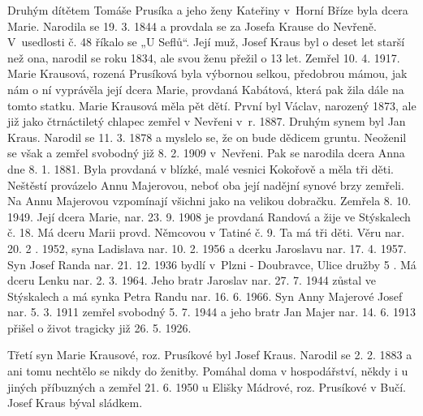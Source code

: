 \documentclass[../dejiny-rodu-prusiku.tex]{subfiles}
\begin{document}

Druhým dítětem Tomáše Prusíka a jeho ženy Kateřiny v Horní Bříze byla dcera Marie. Narodila se 19. 3. 1844 a provdala se za Josefa Krause do Nevřeně. V usedlosti č. 48 říkalo se „U Seflů“. Její muž, Josef Kraus byl o deset let starší než ona, narodil se roku 1834, ale svou ženu přežil o 13 let. Zemřel 10. 4. 1917. Marie Krausová, rozená Prusíková byla výbornou selkou, předobrou mámou, jak nám o ní vyprávěla její dcera Marie, provdaná Kabátová, která pak žila dále na tomto statku. Marie Krausová měla pět dětí. První byl Václav, narozený 1873, ale již jako čtrnáctiletý chlapec zemřel v Nevřeni v r. 1887. Druhým synem byl Jan Kraus. Narodil se 11. 3. 1878 a mysle­lo se, že on bude dědicem gruntu. Neoženil se však a zemřel svobodný již 8. 2. 1909 v Nevřeni. Pak se narodila dcera Anna dne 8. 1. 1881. Byla provdaná v blízké, malé vesnici Kokořově a měla tři děti. Neštěstí prováze­lo Annu Majerovou, neboť oba její nadějní synové brzy zemřeli. Na Annu Majerovou vzpomínají všichni jako na velikou dobračku. Zemřela 8. 10. 1949. Její dcera Marie, nar. 23. 9. 1908 je provdaná Randová a žije ve Stýskalech č. 18. Má dceru Marii provd. Němcovou v Tatiné č. 9. Ta má tři děti. Věru nar. 20. 2 . 1952, syna Ladislava nar. 10. 2. 1956 a dcerku Jaroslavu nar. 17. 4. 1957. Syn Josef Randa nar. 21. 12. 1936 bydlí v Plzni - Doubravce, Ulice družby 5 . Má dceru Lenku nar. 2. 3. 1964. Jeho bratr Jaroslav nar. 27. 7. 1944 zůstal ve Stýskalech a má synka Petra Ran­du nar. 16. 6. 1966. Syn Anny Majerové Josef nar. 5. 3. 1911 zemřel svobodný 5. 7. 1944 a jeho bratr Jan Majer nar. 14. 6. 1913 přišel o život tragicky již 26. 5. 1926.

Třetí syn Marie Krausové, roz. Prusíkové byl Josef Kraus. Narodil se 2. 2. 1883 a ani tomu nechtělo se nikdy do že­nitby. Pomáhal doma v hospodářství, někdy i u jiných příbuzných a zemřel 21. 6. 1950 u Elišky Mádrové, roz. Prusíkové v Bučí. Josef Kraus býval sládkem.
\end{document}
